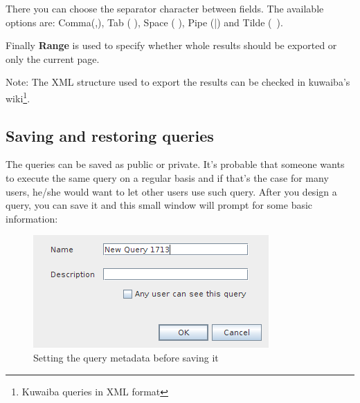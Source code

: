 \documentclass[a4paper]{article}
\begin{document}
	There you can choose the separator character between fields. The available options are: Comma(,), Tab (	), Space ( ), Pipe (|) and Tilde (~).
	
	Finally \textbf{Range} is used to specify whether whole results should be exported or only the current page.
	
	Note: The XML structure used to export the results can be checked in kuwaiba's wiki\footnote{Kuwaiba queries in XML format }.
	
	\subsection{Saving and restoring queries}
	The queries can be saved as public or private. It's probable that someone wants to execute the same query on a regular basis and if that's the case for many users, he/she would want to let other users use such query. After you design a query, you can save it and this small window will prompt for some basic information:
	\begin{figure}[h!]
		\centering
		\includegraphics[width=0.5\linewidth]{img/query_save_menu.png}
		\caption{Setting the query metadata before saving it}
		\label{fig:query_save_menu}
	\end{figure}
	
\end{document}
